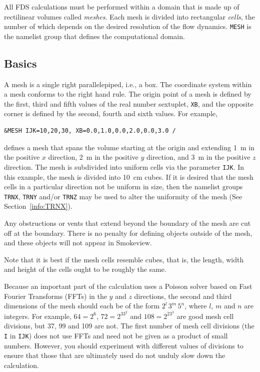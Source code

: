 \documentclass[11pt]{book}
\newcommand{\ct}{\tt\small}
\begin{document}
All FDS calculations must be performed within a domain that is made up
of rectilinear volumes called {\em meshes}. Each mesh is divided into rectangular {\em cells},
the number of which depends on the desired resolution of the flow dynamics.
{\ct MESH} is the namelist group that defines the computational domain.

\subsection{Basics}
\label{info:MESH_Basics}

A mesh is a single right parallelepiped, i.e., a box.
The coordinate system within a mesh conforms to the right hand rule.
The origin point of a mesh is defined by the first, third
and fifth values of the real number sextuplet, {\ct XB}, and the opposite
corner is defined by the second, fourth and sixth values.
For example,

\footnotesize
\begin{verbatim}
&MESH IJK=10,20,30, XB=0.0,1.0,0.0,2.0,0.0,3.0 /
\end{verbatim}

\normalsize
\noindent
defines a mesh that spans the volume starting at the origin and extending 1~m in the positive
$x$ direction, 2~m in the positive $y$ direction, and 3~m in the positive $z$ direction.
The mesh is subdivided into uniform cells via the parameter
{\ct IJK}. In this example, the mesh is divided into 10~cm cubes.
If it is desired that the mesh cells in a particular direction not be uniform in size,
then the namelist groups {\ct TRNX}, {\ct TRNY} and/or {\ct TRNZ} may be used to alter the
uniformity of the mesh (See Section~\ref{info:TRNX}).

Any obstructions or vents that extend beyond the boundary of the mesh
are cut off at the boundary. There is no penalty for defining objects
outside of the mesh, and these objects will not appear in Smokeview.

\begin{warning}
\noindent
Note that it is best if the mesh cells resemble cubes, that is, the
length, width and height of the cells ought to be roughly the same.
\end{warning}

\noindent
Because an important part of the calculation uses a Poisson solver based on
Fast Fourier Transforms (FFTs) in the $y$ and $z$ directions, the second and third dimensions
of the mesh should each be of the form $2^l \, 3^m \, 5^n$, where
$l$, $m$ and $n$ are integers. For example,
$64=2^6$, $72=2^33^2$ and $108=2^23^3$ are good mesh cell divisions, but 37, 99 and 109 are not.
The first number of mesh cell divisions (the {\ct I} in {\ct IJK}) does not use FFTs and need not be given as a
product of small numbers. However, you should experiment with different values of
divisions to ensure that those that are ultimately used do not unduly slow down the calculation.
\end{document}
